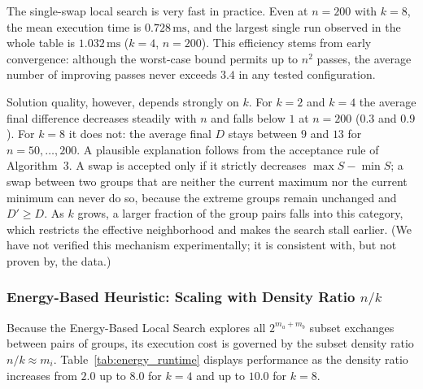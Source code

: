 \documentclass[11pt,a4paper]{article}
\begin{document}
The single-swap local search is very fast in practice. Even at $n=200$ with $k=8$, the mean execution time is $0.728\,\text{ms}$, and the largest single run observed in the whole table is $1.032\,\text{ms}$ ($k=4$, $n=200$). This efficiency stems from early convergence: although the worst-case bound permits up to $n^2$ passes, the average number of improving passes never exceeds $3.4$ in any tested configuration.

Solution quality, however, depends strongly on $k$. For $k=2$ and $k=4$ the average final difference decreases steadily with $n$ and falls below $1$ at $n=200$ ($0.3$ and $0.9$). For $k=8$ it does not: the average final $D$ stays between $9$ and $13$ for $n=50,\ldots,200$. A plausible explanation follows from the acceptance rule of Algorithm~3. A swap is accepted only if it strictly decreases $\max S-\min S$; a swap between two groups that are neither the current maximum nor the current minimum can never do so, because the extreme groups remain unchanged and $D'\ge D$. As $k$ grows, a larger fraction of the group pairs falls into this category, which restricts the effective neighborhood and makes the search stall earlier. (We have not verified this mechanism experimentally; it is consistent with, but not proven by, the data.)

\subsubsection{Energy-Based Heuristic: Scaling with Density Ratio $n/k$}
Because the Energy-Based Local Search explores all $2^{m_a + m_b}$ subset exchanges between pairs of groups, its execution cost is governed by the subset density ratio $n/k \approx m_i$. Table~\ref{tab:energy_runtime} displays performance as the density ratio increases from $2.0$ up to $8.0$ for $k=4$ and up to $10.0$ for $k=8$.
\end{document}
